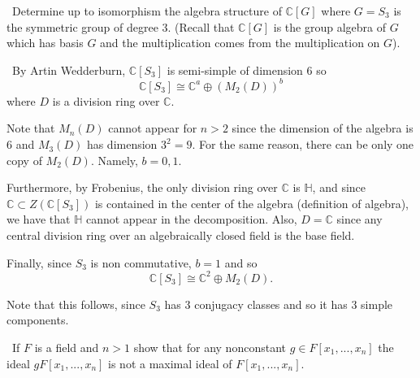 \documentclass[12pt]{Qual}
\begin{document}
\begin{problem} $\,$
Determine up to isomorphism the algebra structure of $\mathbb{C}[G]$ where $G=S_3$ is the symmetric group of degree $3.$ (Recall that $\mathbb{C}[G]$ is the group algebra of $G$ which has basis $G$ and the multiplication comes from the multiplication on $G$).
\end{problem}


\begin{solution}$\,$
By Artin Wedderburn, $\mathbb{C}[S_3]$ is semi-simple of dimension $6$ so $$\mathbb{C}[S_3]\cong\mathbb{C}^a\oplus (M_2(D))^b$$ where $D$ is a division ring over $\mathbb{C}$.

Note that $M_n(D)$ cannot appear for $n>2$ since the dimension of the algebra is $6$ and $M_3(D)$ has dimension $3^2=9$. For the same reason, there can be only one copy of $M_2(D)$. Namely, $b=0,1$.

Furthermore, by Frobenius, the only division ring over $\mathbb{C}$ is $\mathbb{H}$, and since $\mathbb{C}\subset Z(\mathbb{C}[S_3])$ is contained in the center of the algebra (definition of algebra), we have that $\mathbb{H}$ cannot appear in the decomposition. Also, $D=\mathbb{C}$ since any central division ring over an algebraically closed field is the base field.

Finally, since $S_3$ is non commutative, $b=1$ and so $$\mathbb{C}[S_3]\cong\mathbb{C}^2\oplus M_2(D).$$

\begin{mybox}
Note that this follows, since $S_3$ has $3$ conjugacy classes and so it has $3$ simple components.
\end{mybox}
\end{solution}
\newpage




\begin{problem} $\,$
If $F$ is a field and $n>1$ show that for any nonconstant $g\in F[x_1,...,x_n]$ the ideal $gF[x_1,...,x_n]$ is not a maximal ideal of $F[x_1,...,x_n]$.
\end{problem}
\end{document}
